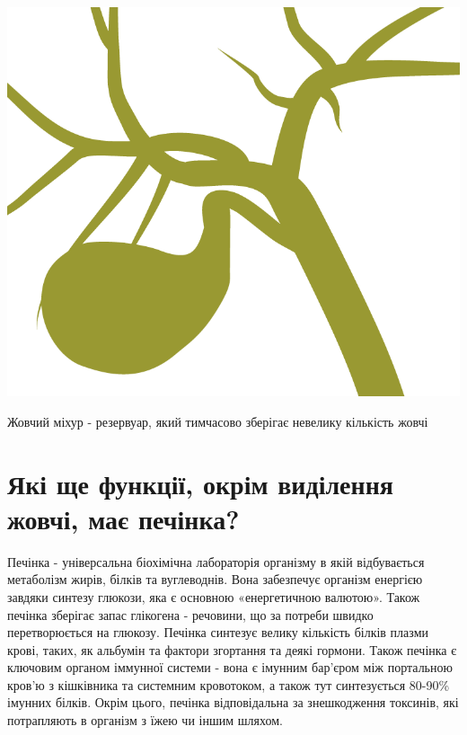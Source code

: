 \begin{marginfigure}[50pt]%
  \includegraphics[width=\linewidth]{Figures/Goalbladder_Focus on hilum.png}
  \caption{Жовчий міхур - резервуар, який тимчасово зберігає невелику кількість жовчі}
  \label{fig:goalbladder}
\end{marginfigure}

\section{Які ще функції, окрім виділення жовчі, має печінка?}

Печінка - універсальна біохімічна лабораторія організму в якій відбувається метаболізм жирів, білків та вуглеводнів. Вона забезпечує організм енергією завдяки синтезу глюкози, яка є основною «енергетичною валютою».  Також  печінка зберігає запас глікогена - речовини, що за потреби швидко перетворюється на глюкозу. Печінка синтезує велику кількість білків плазми крові, таких, як альбумін та фактори згортання та деякі гормони. Також печінка є ключовим органом іммунної системи - вона є імунним бар’єром між портальною кров’ю з кішківника та системним кровотоком, а також тут синтезується 80-90\% імунних білків. Окрім цього, печінка відповідальна за знешкодження токсинів, які потрапляють в організм з їжею чи іншим шляхом. 

